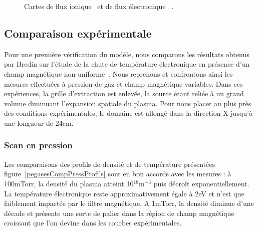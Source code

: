\begin{refsection}
\begin{figure}[!htbp]
  \centering
    \caption{Cartes de flux ionique ~et de flux
    électronique ~.}
    \label{4-PegasesCarteFlux}
\end{figure}

\subsection{Comparaison expérimentale}
Pour une première vérification du modèle, nous
comparons les résultats obtenus par Bredin sur l'étude de la
chute de température électronique en présence d'un champ magnétique
non-uniforme~\parencite{Bredin}. Nous reprenons et confrontons ainsi les mesures
effectuées à pression de gaz et champ magnétique variables. Dans ces expériences, la grille
d'extraction est enlevée, la source étant reliée à un grand volume diminuant
l'expansion spatiale du plasma. Pour nous placer au plus près des conditions
expérimentales, le domaine est allongé dans la direction X jusqu'à une longueur
de 24cm.
	
	\subsubsection{Scan en pression}
	Les comparaisons des profils de densité et de température présentées
	figure~\ref{pegasesCompPressProfils} sont en bon accords avec les mesures : à
	100mTorr, la densité du plasma atteint 10$^{18}\text{m}^{-3}$ puis décroît
	exponentiellement. La température électronique reste approximativement égale à
	2eV et n'est que faiblement impactée par le filtre magnétique. A 1mTorr, la
	densité diminue d'une décade et présente une sorte de palier dans la région de
	champ magnétique croissant que l'on devine dans les courbes expérimentales.
	

\end{refsection}

